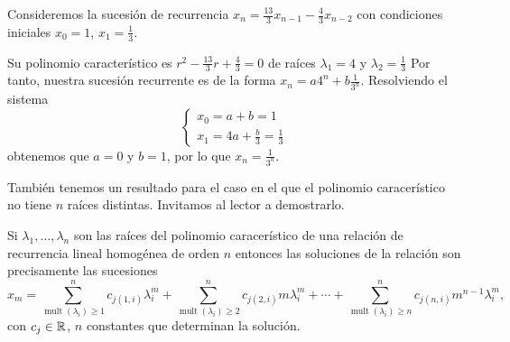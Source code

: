 \begin{example}
    Consideremos la sucesión de recurrencia
    $x_n = \frac{13}{3}x_{n-1} - \frac{4}{3}x_{n-2}$
    con condiciones iniciales $x_0 = 1$, $x_1 = \frac{1}{3}$.

    Su polinomio característico es $r^2-\frac{13}{3}r+\frac{4}{3} = 0$
    de raíces $\lambda_1 = 4$ y $\lambda_2 = \frac{1}{3}$
    Por tanto, nuestra sucesión recurrente es de la forma
    $x_n = a4^n + b\frac{1}{3^n}$.
    Resolviendo el sistema
    \begin{equation*}
        \left\{\begin{matrix}
        x_0 = a+b = 1 \\
        x_1 = 4a + \frac{b}{3} = \frac{1}{3}
        \end{matrix}\right.
    \end{equation*}
    obtenemos que $a = 0$ y $b = 1$,
    por lo que $x_n = \frac{1}{3^n}$.
\end{example}

También tenemos un resultado para el caso en el que
el polinomio caracerístico no tiene $n$ raíces distintas.
Invitamos al lector a demostrarlo.

\begin{proposition}
    \newcommand{\mult}[1]{\operatorname{mult}(#1)}

    Si $\lambda_1,\ldots,\lambda_n$ son las raíces
    del polinomio caracerístico de
    una relación de recurrencia lineal homogénea de orden $n$
    entonces las soluciones de la relación son precisamente las sucesiones
    \begin{equation*}
        x_m =
        \sum_{\mult{\lambda_i} \ge 1}^n c_{j(1, i)}\lambda_i^m +
        \sum_{\mult{\lambda_i} \ge 2}^n c_{j(2, i)}m\lambda_i^m +
        \cdots +
        \sum_{\mult{\lambda_i} \ge n}^n c_{j(n, i)}m^{n-1}\lambda_i^m,
    \end{equation*}
    con $c_j \in \mathbb{R}$, $n$ constantes que determinan la solución.
\end{proposition}

